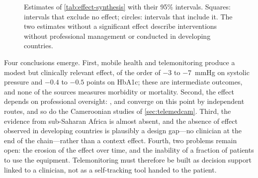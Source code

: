 \begin{figure}[htbp]
\centering
{}
\caption{Estimates of \cref{tab:effect-synthesis} with their 95\% intervals. Squares: intervals that exclude no effect; circles: intervals that include it. The two estimates without a significant effect describe interventions without professional management or conducted in developing countries.}\label{fig:sbp-forest}
\end{figure}

Four conclusions emerge. First, mobile health and telemonitoring produce a modest but clinically relevant effect, of the order of $-3$ to $-7$~mmHg on systolic pressure and $-0.4$ to $-0.5$ points on HbA1c; these are intermediate outcomes, and none of the sources measures morbidity or mortality. Second, the effect depends on professional oversight: \textcite{mao2020}, \textcite{bandeira2024} and \textcite{mihevc2025} converge on this point by independent routes, and so do the Cameroonian studies of \cref{sec:telemedcam}. Third, the evidence from sub-Saharan Africa is almost absent, and the absence of effect observed in developing countries is plausibly a design gap---no clinician at the end of the chain---rather than a context effect. Fourth, two problems remain open: the erosion of the effect over time, and the inability of a fraction of patients to use the equipment. Telemonitoring must therefore be built as decision support linked to a clinician, not as a self-tracking tool handed to the patient.

